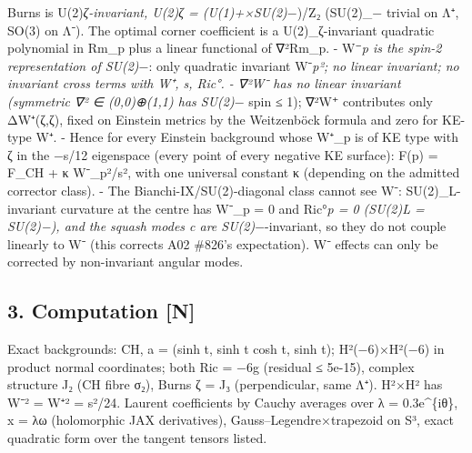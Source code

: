 \documentclass[
  10pt,
]{report}
\begin{document}
Burns is U(2)\emph{ζ-invariant, U(2)\emph{ζ = (U(1)}+×SU(2)}−)/Z₂
(SU(2)\_− trivial on Λ⁺, SO(3) on Λ⁻). The optimal corner coefficient is
a U(2)\_ζ-invariant quadratic polynomial in Rm\_p plus a linear
functional of ∇²Rm\_p. - W⁻\emph{p is the spin-2 representation of
SU(2)}−: only quadratic invariant \textbar W⁻\emph{p\textbar²; no linear
invariant; no invariant cross terms with W⁺, s, Ric°. - ∇²W⁻ has no
linear invariant (symmetric ∇² ∈ (0,0)⊕(1,1) has SU(2)}− spin ≤ 1); ∇²W⁺
contributes only ΔW⁺(ζ,ζ), fixed on Einstein metrics by the Weitzenböck
formula and zero for KE-type W⁺. - Hence for every Einstein background
whose W⁺\_p is of KE type with ζ in the −s/12 eigenspace (every point of
every negative KE surface): F(p) = F\_CH + κ \textbar W⁻\_p\textbar²/s²,
with one universal constant κ (depending on the admitted corrector
class). - The Bianchi-IX/SU(2)-diagonal class cannot see W⁻:
SU(2)\_L-invariant curvature at the centre has W⁻\_p = 0 and Ric°\emph{p
= 0 (SU(2)\emph{L = SU(2)}−), and the squash modes c are
SU(2)}−-invariant, so they do not couple linearly to W⁻ (this corrects
A02 \#826's expectation). W⁻ effects can only be corrected by
non-invariant angular modes.

\hypertarget{computation-n}{%
\subsection{3. Computation {[}N{]}}\label{computation-n}}

Exact backgrounds: CH, a = (sinh t, sinh t cosh t, sinh t);
H²(−6)×H²(−6) in product normal coordinates; both Ric = −6g (residual ≤
5e-15), complex structure J₂ (CH fibre σ₂), Burns ζ = J₃ (perpendicular,
same Λ⁺). H²×H² has \textbar W⁻\textbar² = \textbar W⁺\textbar² = s²/24.
Laurent coefficients by Cauchy averages over λ = 0.3e\^{}\{iθ\}, x = λω
(holomorphic JAX derivatives), Gauss--Legendre×trapezoid on S³, exact
quadratic form over the tangent tensors listed.
\end{document}
